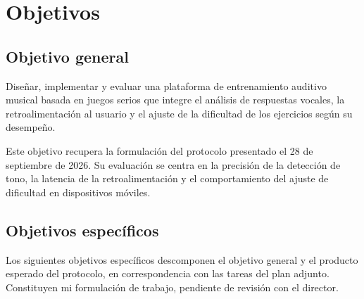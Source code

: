 \chapter{Objetivos}
\label{cap:objetivos}
\section{Objetivo general}
Diseñar, implementar y evaluar una plataforma de entrenamiento auditivo musical basada
en juegos serios que integre el análisis de respuestas vocales, la retroalimentación al
usuario y el ajuste de la dificultad de los ejercicios según su desempeño.

Este objetivo recupera la formulación del protocolo presentado el 28 de septiembre de
2026. Su evaluación se centra en la precisión de la detección de tono, la latencia de la
retroalimentación y el comportamiento del ajuste de dificultad en dispositivos móviles.
\section{Objetivos específicos}
Los siguientes objetivos específicos descomponen el objetivo general y el producto
esperado del protocolo, en correspondencia con las tareas del plan adjunto. Constituyen
mi formulación de trabajo, pendiente de revisión con el director.

